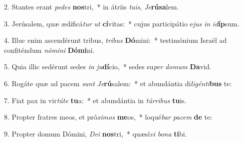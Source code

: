 2. Stantes erant \textit{pe}\textit{des} \textbf{nos}tri,~*  in átriis \textit{tu}\textit{is}, \textit{Je}\textbf{rú}\textbf{sa}lem.\

3. Jerúsalem, quæ ædificá\textit{tur} \textit{ut} \textbf{cí}vitas:~*  cujus participátio e\textit{jus} \textit{in} \textit{id}\textbf{íp}sum.\

4. Illuc enim ascendérunt tribus, \textit{tri}\textit{bus} \textbf{Dó}mini:~*  testimónium Israël ad confiténdum \textit{nó}\textit{mi}\textit{ni} \textbf{Dó}\textbf{mi}ni.\

5. Quia illic sedérunt sedes \textit{in} \textit{ju}\textbf{dí}cio,~*  sedes su\textit{per} \textit{do}\textit{mum} \textbf{Da}vid.\

6. Rogáte quæ ad pacem \textit{sunt} \textit{Je}\textbf{rú}salem:~*  et abundántia di\textit{li}\textit{gén}\textit{ti}\textbf{bus} te:\

7. Fiat pax in vir\textit{tú}\textit{te} \textbf{tu}a:~*  et abundántia in \textit{túr}\textit{ri}\textit{bus} \textbf{tu}is.\

8. Propter fratres meos, et pró\textit{xi}\textit{mos} \textbf{me}os,~*  loqué\textit{bar} \textit{pa}\textit{cem} \textbf{de} te:\

9. Propter domum Dómini, \textit{De}\textit{i} \textbf{nos}tri,~*  quæsí\textit{vi} \textit{bo}\textit{na} \textbf{ti}bi.\

